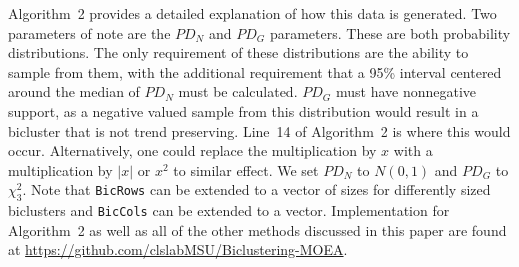 Algorithm~2 provides a detailed explanation of how this data is generated. Two parameters of note are the \texttt{$PD_N$} and \texttt{$PD_G$} parameters. These are both probability distributions. The only requirement of these distributions are the ability to sample from them, with the additional requirement that a 95\% interval centered around the median of \texttt{$PD_N$} must be calculated. \texttt{$PD_G$} must have nonnegative support, as a negative valued sample from this distribution would result in a bicluster that is not trend preserving. Line~14 of Algorithm~2 is where this would occur. Alternatively, one could replace the multiplication by $x$ with a multiplication by $|x|$ or $x^2$ to similar effect. We set \texttt{$PD_N$} to  $N(0, 1)$ and \texttt{$PD_G$} to $\chi^2_3$. Note that \texttt{BicRows} can be extended to a vector of sizes for differently sized biclusters and \texttt{BicCols} can be extended to a vector.
Implementation for Algorithm~2 as well as all of the other methods discussed in this paper are found at \url{https://github.com/clslabMSU/Biclustering-MOEA}.





